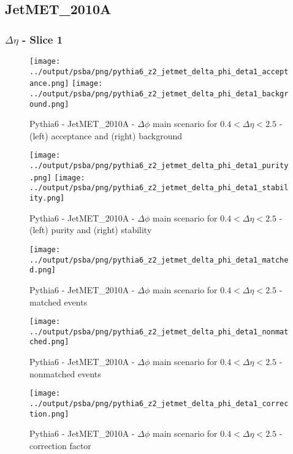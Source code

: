 \documentclass[11pt]{book}
\begin{document}
\clearpage
\subsection{JetMET\_2010A}

\subsubsection{$\Delta\eta$ - Slice 1}
\begin{figure}[ht]
\centering
\texttt{[image: ../output/psba/png/pythia6\_z2\_jetmet\_delta\_phi\_deta1\_acceptance.png]}
\texttt{[image: ../output/psba/png/pythia6\_z2\_jetmet\_delta\_phi\_deta1\_background.png]}
\caption{Pythia6 - JetMET\_2010A - $\Delta\phi$ main scenario for $0.4 < \Delta\eta < 2.5$ - (left) acceptance and (right) background}
\label{fig:p6_jetmet_delta_phi_deta1_ab}
\end{figure}

\begin{figure}[ht]
\centering
\texttt{[image: ../output/psba/png/pythia6\_z2\_jetmet\_delta\_phi\_deta1\_purity.png]}
\texttt{[image: ../output/psba/png/pythia6\_z2\_jetmet\_delta\_phi\_deta1\_stability.png]}
\caption{Pythia6 - JetMET\_2010A - $\Delta\phi$ main scenario for $0.4 < \Delta\eta < 2.5$ - (left) purity and (right) stability}
\label{fig:p6_jetmet_delta_phi_deta1_ps}
\end{figure}

\begin{figure}[ht]
\centering
\texttt{[image: ../output/psba/png/pythia6\_z2\_jetmet\_delta\_phi\_deta1\_matched.png]}
\caption{Pythia6 - JetMET\_2010A - $\Delta\phi$ main scenario for $0.4 < \Delta\eta < 2.5$ - matched events}
\label{fig:p6_jetmet_delta_phi_deta1_matched}
\end{figure}

\begin{figure}[ht]
\centering
\texttt{[image: ../output/psba/png/pythia6\_z2\_jetmet\_delta\_phi\_deta1\_nonmatched.png]}
\caption{Pythia6 - JetMET\_2010A - $\Delta\phi$ main scenario for $0.4 < \Delta\eta < 2.5$ - nonmatched events}
\label{fig:p6_jetmet_delta_phi_deta1_nonmatched}
\end{figure}

\begin{figure}[ht]
\centering
\texttt{[image: ../output/psba/png/pythia6\_z2\_jetmet\_delta\_phi\_deta1\_correction.png]}
\caption{Pythia6 - JetMET\_2010A - $\Delta\phi$ main scenario for $0.4 < \Delta\eta < 2.5$ - correction factor}
\label{fig:p6_jetmet_delta_phi_deta1_correction}
\end{figure}
\end{document}

